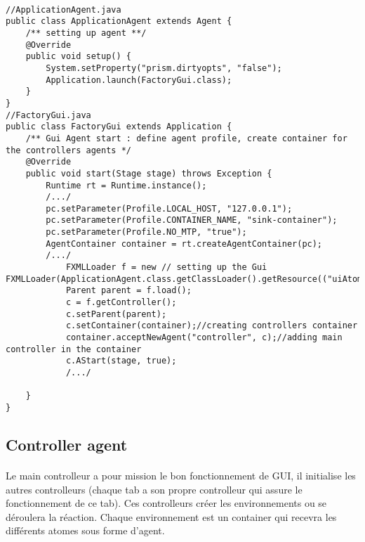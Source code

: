 \usetikzlibrary{arrows.meta}


\begin{lstlisting}

//ApplicationAgent.java
public class ApplicationAgent extends Agent {
    /** setting up agent **/
    @Override
    public void setup() {
        System.setProperty("prism.dirtyopts", "false");
        Application.launch(FactoryGui.class);
    }
}
//FactoryGui.java
public class FactoryGui extends Application {
    /** Gui Agent start : define agent profile, create container for the controllers agents */
    @Override
    public void start(Stage stage) throws Exception {
        Runtime rt = Runtime.instance();
        /.../
        pc.setParameter(Profile.LOCAL_HOST, "127.0.0.1");
        pc.setParameter(Profile.CONTAINER_NAME, "sink-container");
        pc.setParameter(Profile.NO_MTP, "true");
        AgentContainer container = rt.createAgentContainer(pc);
        /.../
            FXMLLoader f = new // setting up the Gui FXMLLoader(ApplicationAgent.class.getClassLoader().getResource(("uiAtoms.fxml")));
            Parent parent = f.load();
            c = f.getController();
            c.setParent(parent);
            c.setContainer(container);//creating controllers container 
            container.acceptNewAgent("controller", c);//adding main controller in the container
            c.AStart(stage, true);
            /.../

    }
}
\end{lstlisting}

\subsection{Controller agent}
\paragraph{}
Le main controlleur a pour mission le bon fonctionnement de GUI, il initialise les autres controlleurs (chaque tab a son propre controlleur qui assure le fonctionnement de ce tab). Ces controlleurs créer les environnements ou se déroulera la réaction. Chaque environnement est un container qui recevra les différents atomes sous forme d'agent.



